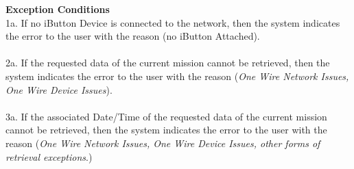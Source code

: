 \documentclass[letterpaper]{article}
\begin{document}
\textbf{Exception Conditions}\\
1a.  If no iButton Device is connected to the network, then the system
indicates the error to the user with the reason (no iButton Attached).
\\\\
2a.  If the requested data of the current mission cannot be retrieved,
then the system indicates the error to the user with the reason
(\textit{One Wire Network Issues, One Wire Device Issues}).\\\\
3a.  If the associated Date/Time of the requested data of the current
mission cannot be retrieved, then the system indicates the error to
the user with the reason (\textit{One Wire Network Issues, One Wire
Device Issues, other forms of retrieval exceptions}.)
\end{document}
